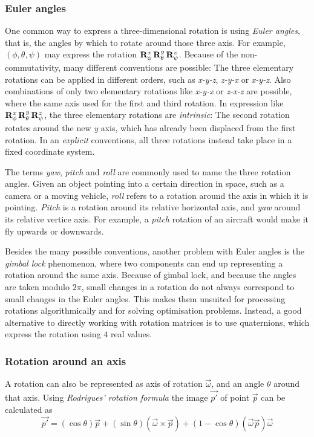 \subsubsection{Euler angles}
One common way to express a three-dimensional rotation is using \emph{Euler angles}, that is, the angles by which to rotate around those three axis. For example, $(\phi, \theta, \psi)$ may express the rotation $\mathbf{R}_{\phi}^x \, \mathbf{R}_{\theta}^y \, \mathbf{R}_{\psi}^z$. Because of the non-commutativity, many different conventions are possible: The three elementary rotations can be applied in different orders, such as \emph{x-y-z}, \emph{z-y-x} or \emph{x-y-z}. Also combinations of only two elementary rotations like \emph{x-y-x} or \emph{z-x-z} are possible, where the same axis used for the first and third rotation. In expression like $\mathbf{R}_{\phi}^x \, \mathbf{R}_{\theta}^y \, \mathbf{R}_{\psi}^z$, the three elementary rotations are \emph{intrinsic}: The second rotation rotates around the new \emph{y} axis, which has already been displaced from the first rotation. In an \emph{explicit} conventions, all three rotations instead take place in a fixed coordinate system.

The terms \emph{yaw}, \emph{pitch} and \emph{roll} are commonly used to name the three rotation angles. Given an object pointing into a certain direction in space, such as a camera or a moving vehicle, \emph{roll} refers to a rotation around the axis in which it is pointing. \emph{Pitch} is a rotation around its relative horizontal axis, and \emph{yaw} around its relative vertice axis. For example, a \emph{pitch} rotation of an aircraft would make it fly upwards or downwards.

Besides the many possible conventions, another problem with Euler angles is the \emph{gimbal lock} phenomenon, where two components can end up representing a rotation around the same axis. Because of gimbal lock, and because the angles are taken modulo $2\pi$, small changes in a rotation do not always correspond to small changes in the Euler angles. This makes them unsuited for processing rotations algorithmically and for solving optimisation problems. Instead, a good alternative to directly working with rotation matrices is to use quaternions, which express the rotation using $4$ real values.

\subsubsection{Rotation around an axis}
A rotation can also be represented as axis of rotation $\vec{\omega}$, and an angle $\theta$ around that axis. Using \emph{Rodrigues' rotation formula} the image $\vec{p'}$ of point $\vec{p}$ can be calculated as
\begin{equation}
\vec{p'} = (\cos \theta) \vec{p} + (\sin \theta) (\vec{\omega} \times \vec{p}) + (1 - \cos \theta) (\vec{\omega} \vec{p}) \vec{\omega}
\end{equation}

